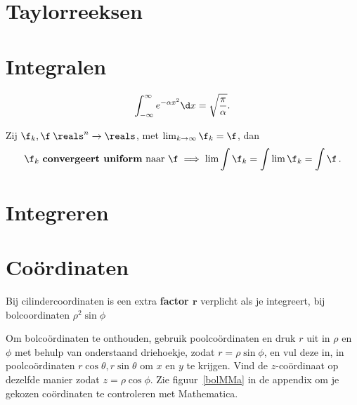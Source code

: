 \documentclass{article}
\begin{document}
    \section{Taylorreeksen}\label{sec:taylorreeksen}
    

    \section{Integralen}\label{sec:integralen}

    \begin{stelling}
        \[ \int_{-\infty}^\infty e^{-\alpha x^2} \d x = \sqrt {\frac \pi \alpha}.\]
    \end{stelling}

    \begin{stelling}
        Zij $\f_k,\f \: \reals^n \to \reals$, met $\lim_{k \to \infty} \f_k = \f$, dan
        \[ \f_k \text { \textbf{convergeert uniform} naar } \f \implies \lim \int \f_k = \int \lim \f_k = \int \f \,. \]
    \end{stelling}

    \section{Integreren}\label{sec:integreren}
    

    \section{Co\"ordinaten}\label{sec:coordinaten}
    Bij cilindercoordinaten is een extra \textbf{factor $\bm r$} verplicht als je integreert, bij bolcoordinaten $\rho^2 \sin \phi$

    Om bolco\"ordinaten te onthouden, gebruik poolco\"ordinaten en druk $r$ uit in $\rho$ en $\phi$ met behulp van onderstaand driehoekje, zodat $r=\rho \sin \phi$, en vul deze in, in poolco\"ordinaten $r \cos \theta,r \sin \theta$ om $x$ en $y$ te krijgen.
    Vind de $z$-co\"ordinaat op dezelfde manier zodat $z=\rho \cos \phi$.
    Zie figuur~\ref{bolMMa} in de appendix om je gekozen co\"ordinaten te controleren met Mathematica.

\end{document}
